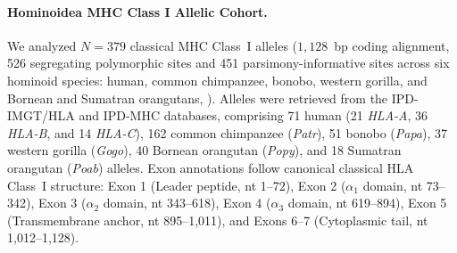 \paragraph{Hominoidea MHC Class I Allelic Cohort.}
We analyzed $N = 379$ classical MHC Class~I alleles ($1{,}128$~bp coding alignment, 526 segregating polymorphic sites and 451 parsimony-informative sites across six hominoid species: human, common chimpanzee, bonobo, western gorilla, and Bornean and Sumatran orangutans, \citealt{maccari2017ipd}).
Alleles were retrieved from the IPD-IMGT/HLA and IPD-MHC databases, comprising 71 human (21 \textit{HLA-A}, 36 \textit{HLA-B}, and 14 \textit{HLA-C}), 162 common chimpanzee (\textit{Patr}), 51 bonobo (\textit{Papa}), 37 western gorilla (\textit{Gogo}), 40 Bornean orangutan (\textit{Popy}), and 18 Sumatran orangutan (\textit{Poab}) alleles.
Exon annotations follow canonical classical HLA Class~I structure: Exon 1 (Leader peptide, nt 1--72), Exon 2 ($\alpha_1$ domain, nt 73--342), Exon 3 ($\alpha_2$ domain, nt 343--618), Exon 4 ($\alpha_3$ domain, nt 619--894), Exon 5 (Transmembrane anchor, nt 895--1,011), and Exons 6--7 (Cytoplasmic tail, nt 1,012--1,128).

\clearpage

